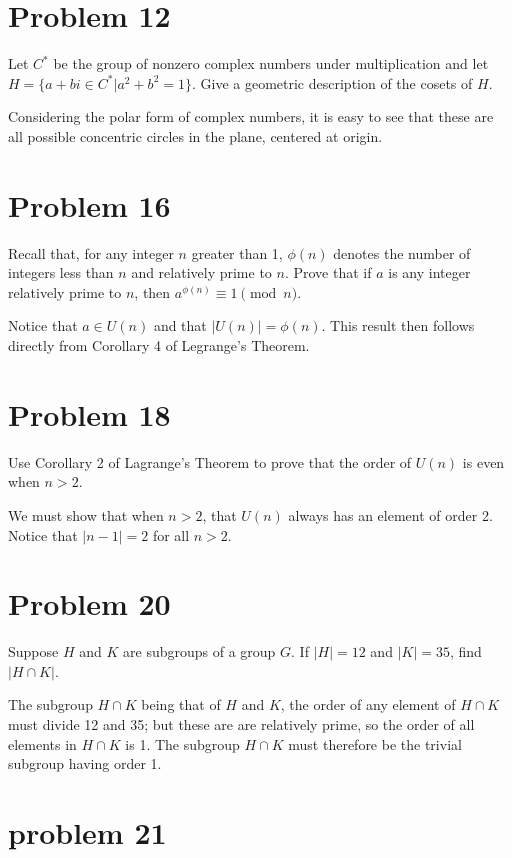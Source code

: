 \documentclass[12pt]{article}
\begin{document}
\section*{Problem 12}

Let $C^*$ be the group of nonzero complex numbers under multiplication
and let $H=\{a+bi\in C^*|a^2+b^2=1\}$.  Give a geometric description
of the cosets of $H$.

Considering the polar form of complex numbers, it is easy to see that these
are all possible concentric circles in the plane, centered at origin.

\section*{Problem 16}

Recall that, for any integer $n$ greater than 1, $\phi(n)$ denotes the number of
integers less than $n$ and relatively prime to $n$.  Prove that if $a$ is any
integer relatively prime to $n$, then $a^{\phi(n)}\equiv 1\pmod n$.

Notice that $a\in U(n)$ and that $|U(n)|=\phi(n)$.  This result then
follows directly from Corollary 4 of Legrange's Theorem.

\section*{Problem 18}

Use Corollary 2 of Lagrange's Theorem to prove that the order of $U(n)$ is even
when $n>2$.

We must show that when $n>2$, that $U(n)$ always has an element of order 2.
Notice that $|n-1|=2$ for all $n>2$.

\section*{Problem 20}

Suppose $H$ and $K$ are subgroups of a group $G$.  If $|H|=12$ and $|K|=35$,
find $|H\cap K|$.

The subgroup $H\cap K$ being that of $H$ and $K$, the order of any element of
$H\cap K$ must divide 12 and 35; but these are
are relatively prime, so the order of all elements in $H\cap K$ is 1.
The subgroup $H\cap K$ must therefore be the trivial subgroup having
order 1.

\section*{problem 21}
\end{document}
